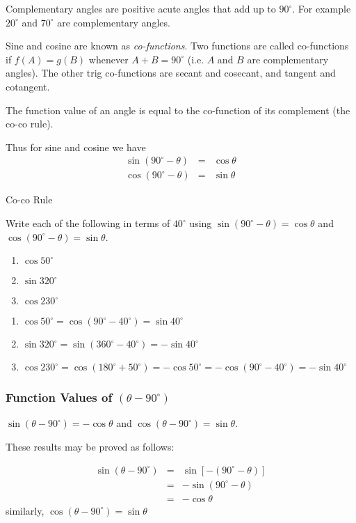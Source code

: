 Complementary angles are positive acute angles that add up to $90^\circ$. For example $20^\circ$ and $70^\circ$ are complementary angles.

Sine and cosine are known as \emph{co-functions}. Two functions are called co-functions if $f(A)=g(B)$ whenever $A+B = 90^{\circ}$ (i.e. $A$ and $B$ are complementary angles). The other trig co-functions are secant and cosecant, and tangent and cotangent.

The function value of an angle is equal to the co-function of its complement (the co-co rule). 

Thus for sine and cosine we have
\begin{eqnarray*}
 \sin (90^\circ-\theta) &=& \cos\theta \\
 \cos (90^\circ-\theta) &=& \sin\theta
\end{eqnarray*}

\begin{wex}{Co-co Rule}
{%
Write each of the following in terms of $40^{\circ}$ using $\sin (90^{\circ}-\theta)=\cos \theta$ and $\cos (90^{\circ}-\theta)=\sin \theta$. \begin{enumerate} \item $\cos 50^{\circ}$ \item $\sin 320^{\circ}$ \item $\cos 230^{\circ}$ \end{enumerate}
}%
{%
\begin{enumerate}
\item $\cos 50^{\circ}=\cos (90^{\circ}-40^{\circ}) = \sin 40^{\circ}$
\item $\sin 320^{\circ} = \sin (360^{\circ}-40^{\circ}) = -\sin 40^{\circ}$
\item $\cos 230^{\circ} = \cos (180^{\circ}+50^{\circ}) = -\cos 50^{\circ} = -\cos (90^{\circ} - 40^{\circ}) = -\sin 40^{\circ}$
\end{enumerate}
}%
\end{wex}

\subsubsection{Function Values of $(\theta - 90^\circ)$}

$\sin(\theta - 90^\circ) = -\cos\theta$ and $\cos(\theta - 90^\circ) = \sin\theta$.

These results may be proved as follows:

\begin{eqnarray*}
\sin(\theta - 90^\circ)& =&\sin[-(90^\circ - \theta)]\\
&=& -\sin(90^\circ - \theta)\\
&=&-\cos\theta
\end{eqnarray*}
similarly, $\cos(\theta - 90^\circ) = \sin\theta$

